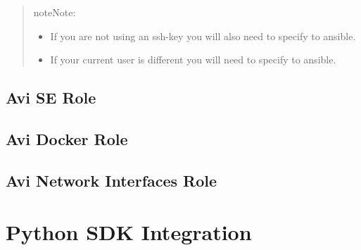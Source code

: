 \documentclass[letterpaper,10pt,english]{sphinxmanual}
\begin{document}
\begin{quote}

\begin{sphinxadmonition}{note}{Note:}\begin{itemize}
\item {} 
If you are not using an ssh-key you will also need to specify  to ansible.

\item {} 
If your current user is different you will need to specify  to ansible.

\end{itemize}
\end{sphinxadmonition}

\begin{sphinxVerbatim}[commandchars=\\\{\}]
    
\end{sphinxVerbatim}
\end{quote}


\subsection{Avi SE Role}
\label{\detokenize{integrations/ansible/serviceengine:avi-se-role}}\label{\detokenize{integrations/ansible/serviceengine::doc}}

\subsection{Avi Docker Role}
\label{\detokenize{integrations/ansible/docker::doc}}\label{\detokenize{integrations/ansible/docker:avi-docker-role}}

\subsection{Avi Network Interfaces Role}
\label{\detokenize{integrations/ansible/network_interfaces:avi-network-interfaces-role}}\label{\detokenize{integrations/ansible/network_interfaces::doc}}

\section{Python SDK Integration}
\label{\detokenize{integrations/python/index:python-sdk-integration}}\label{\detokenize{integrations/python/index::doc}}


\renewcommand{\indexname}{Index}
\printindex
\end{document}
